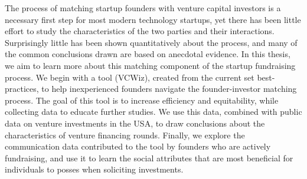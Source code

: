 %
%
%
The process of matching startup founders with venture capital investors is a necessary first step for most modern technology startups, yet there has been little effort to study the characteristics of the two parties and their interactions. Surprisingly little has been shown quantitatively about the process, and many of the common conclusions drawn are based on anecdotal evidence. In this thesis, we aim to learn more about this matching component of the startup fundraising process. We begin with a tool (VCWiz), created from the current set best-practices, to help inexperienced founders navigate the founder-investor matching process. The goal of this tool is to increase efficiency and equitability, while collecting data to educate further studies. We use this data, combined with public data on venture investments in the USA, to draw conclusions about the characteristics of venture financing rounds. Finally, we explore the communication data contributed to the tool by founders who are actively fundraising, and use it to learn the social attributes that are most beneficial for individuals to posses when soliciting investments.
